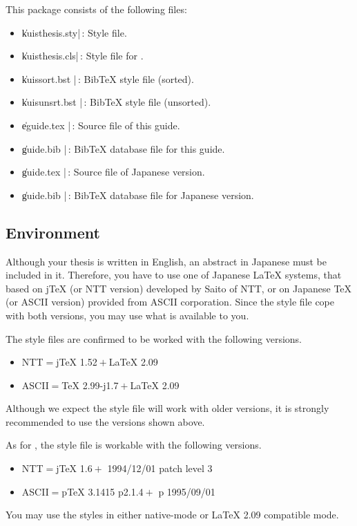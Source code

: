 This package consists of the following files:
\begin{itemize}%
\item
\|kuisthesis.sty|\,:
Style file.
\item
\|kuisthesis.cls|\,:
Style file for \LATEXe.
\item
\|kuissort.bst  |\,:
Bib\TeX{} style file (sorted).
\item
\|kuisunsrt.bst |\,:
Bib\TeX{} style file (unsorted).
\item
\|eguide.tex    |\,:
Source file of this guide. 
\item
\|guide.bib     |\,:
Bib\TeX{} database file for this guide.
\item
\|guide.tex     |\,:
Source file of Japanese version.
\item
\|guide.bib     |\,:
Bib\TeX{} database file for Japanese version.
\end{itemize}%

\subsection[{\protect\LaTeX} Environment]{{\protect\LATex} Environment}
\label{appsub-env}
Although your thesis is written in English, an abstract in Japanese must be
included in it.  Therefore, you have to use one of Japanese {\LaTeX}
systems, that based on j{\TeX} (or NTT version) developed by Saito of NTT,
or on Japanese {\TeX} (or ASCII version) provided from ASCII corporation.
Since the style file cope with both versions, you may use what is available
to you.

The style files are confirmed to be worked with the following versions.
\begin{itemize}%
\item
NTT${}={}${j\TeX} 1.52${}+{}${\LaTeX} 2.09
\item 
ASCII${}={}${\TeX} 2.99-j1.7${}+{}${\LaTeX} 2.09
\end{itemize}%
Although we expect the style file will work with older versions, it is
strongly recommended to use the versions shown above.

As for {\LATEXe}, the style file is workable with the following versions.
\begin{itemize}%
\item
NTT${}={}${j\TeX} 1.6${}+{}$%
	{\LATEXe} 1994/12/01 patch level 3
\item 
ASCII${}={}${p\TeX} 3.1415 p2.1.4${}+{}$%
	{p\LATEXe} 1995/09/01
\end{itemize}%
You may use the styles in either native-mode or {\LaTeX} 2.09 compatible
mode.

